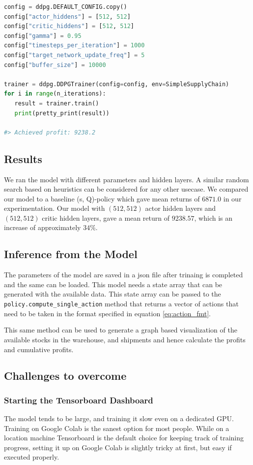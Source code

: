 \documentclass{article}
\begin{document}
\begin{lstlisting}[language=Python]
config = ddpg.DEFAULT_CONFIG.copy()
config["actor_hiddens"] = [512, 512] 
config["critic_hiddens"] = [512, 512]
config["gamma"] = 0.95
config["timesteps_per_iteration"] = 1000
config["target_network_update_freq"] = 5
config["buffer_size"] = 10000
    
trainer = ddpg.DDPGTrainer(config=config, env=SimpleSupplyChain)
for i in range(n_iterations):
   result = trainer.train()
   print(pretty_print(result))
  
#> Achieved profit: 9238.2
\end{lstlisting}

\subsection{Results}
We ran the model with different parameters and hidden layers. A similar random search based on heuristics can be considered for any other usecase. We compared our model to a baseline (s, Q)-policy which gave mean returns of $6871.0$ in our experimentation. Our model with $(512, 512)$ actor hidden layers and $(512, 512)$ critic hidden layers, gave a mean return of $9238.57$, which is an increase of approximately $34 \%$.


\subsection{Inference from the Model}
The parameters of the model are saved in a json file after trinaing is completed and the same can be loaded. This model needs a state array that can be generated with the available data. This state array can be passed to the \lstinline{policy.compute_single_action} method that returns a vector of actions that need to be taken in the format specified in equation \eqref{eq:action_fmt}.

This same method can be used to generate a graph based visualization of the available stocks in the warehouse, and shipments and hence calculate the profits and cumulative profits.

\subsection{Challenges to overcome}
\subsubsection{Starting the Tensorboard Dashboard}
The model tends to be large, and training it slow even on a dedicated GPU. Training on Google Colab is the sanest option for most people. While on a location machine Tensorboard is the default choice for keeping track of training progress, setting it up on Google Colab is slightly tricky at first, but easy if executed properly.
\end{document}
